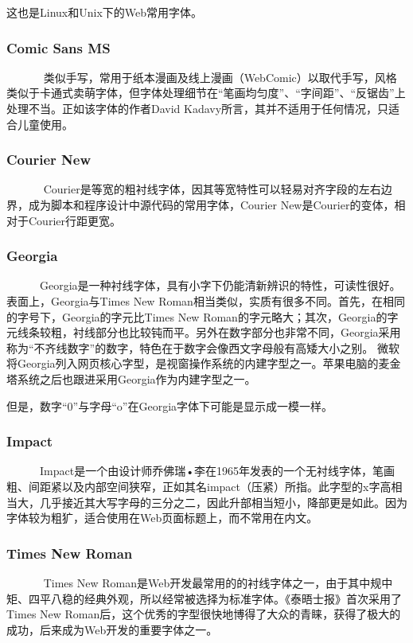 \documentclass[a4paper]{article}
\begin{document}
这也是Linux和Unix下的Web常用字体。
	\subsubsection{Comic Sans MS} 
	
~~~~~~   类似手写，常用于纸本漫画及线上漫画（WebComic）以取代手写，风格类似于卡通式卖萌字体，但字体处理细节在“笔画均匀度”、“字间距”、“反锯齿”上处理不当\cite{cyt3}。正如该字体的作者David Kadavy所言，其并不适用于任何情况，只适合儿童使用。
	\subsubsection{Courier New} 
	
~~~~~~    Courier是等宽的粗衬线字体，因其等宽特性可以轻易对齐字段的左右边界，成为脚本和程序设计中源代码的常用字体，Courier New是Courier的变体，相对于Courier行距更宽。
	\subsubsection{Georgia} 
	
~~~~~~Georgia是一种衬线字体，具有小字下仍能清新辨识的特性，可读性很好。表面上，Georgia与Times New Roman相当类似，实质有很多不同。首先，在相同的字号下，Georgia的字元比Times New Roman的字元略大；其次，Georgia的字元线条较粗，衬线部分也比较钝而平。另外在数字部分也非常不同，Georgia采用称为“不齐线数字”的数字，特色在于数字会像西文字母般有高矮大小之别。
微软将Georgia列入网页核心字型，是视窗操作系统的内建字型之一。苹果电脑的麦金塔系统之后也跟进采用Georgia作为内建字型之一。
	
但是，数字“0”与字母“o”在Georgia字体下可能是显示成一模一样。
	\subsubsection{Impact} 
	
~~~~~~Impact是一个由设计师乔佛瑞•李在1965年发表的一个无衬线字体，笔画粗、间距紧以及内部空间狭窄，正如其名impact（压紧）所指。此字型的x字高相当大，几乎接近其大写字母的三分之二，因此升部相当短小，降部更是如此。因为字体较为粗犷，适合使用在Web页面标题上，而不常用在内文。
	\subsubsection{Times New Roman} 
	
~~~~~~    Times New Roman是Web开发最常用的的衬线字体之一，由于其中规中矩、四平八稳的经典外观，所以经常被选择为标准字体。《泰晤士报》首次采用了Times New Roman后，这个优秀的字型很快地博得了大众的青睐，获得了极大的成功，后来成为Web开发的重要字体之一。
\end{document}
